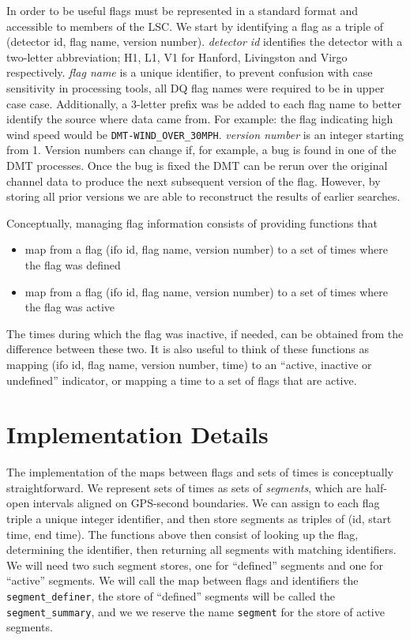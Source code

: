 In order to be useful flags must be represented in a standard format
and accessible to members of the LSC.  We start by identifying a flag
as a triple of (detector id, flag name, version number).
\emph{detector id} identifies the detector with a two-letter
abbreviation; H1, L1, V1 for Hanford, Livingston and Virgo
respectively.  \emph{flag name} is a unique identifier, to prevent
confusion with case sensitivity in processing tools, all DQ flag names
were required to be in upper case case. Additionally, a 3-letter
prefix was be added to each flag name to better identify the source
where data came from. For example: the flag indicating high wind speed
would be \texttt{DMT-WIND\_OVER\_30MPH}.  \emph{version number} is an
integer starting from 1.  Version numbers can change if, for example,
a bug is found in one of the DMT processes.  Once the bug is fixed the
DMT can be rerun over the original channel data to produce the next
subsequent version of the flag.  However, by storing all prior
versions we are able to reconstruct the results of earlier searches. 

Conceptually, managing flag information consists of providing
functions that
%
\begin{itemize}
\item map from a flag (ifo id, flag name, version number) to a set of
times where the flag was defined
\item map from a flag (ifo id, flag name, version number) to a set of
times where the flag was active
\end{itemize}
%
The times
during which the flag was inactive, if needed, can be obtained from the
difference between these two.  It is also useful to think of these
functions as mapping (ifo id, flag name, version number, time) to an
``active, inactive or undefined'' indicator, or mapping a time to a
set of flags that are active.






\section{Implementation Details}

The implementation of the maps between flags and sets of times is
conceptually straightforward.  We represent sets of times as sets of
\emph{segments}, which are half-open intervals aligned on GPS-second
boundaries.  We can assign to each flag triple a unique integer
identifier, and then store segments as triples of (id, start time, end
time).  The functions above then consist of looking up the flag,
determining the identifier, then returning all segments with matching
identifiers.  We will need two such segment stores, one for
``defined'' segments and one for ``active'' segments.  We will call
the map between flags and identifiers the \texttt{segment\_definer},
the store of ``defined'' segments will be called the
\texttt{segment\_summary}, and we we reserve the name \texttt{segment}
for the store of active segments.

